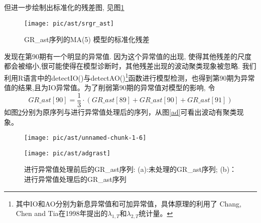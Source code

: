 \documentclass[10.5pt,onecolumn,a4paper]{article}%
\begin{document}
但进一步绘制出标准化的残差图, 见图\ref{fig:srgrast}
\begin{figure}
	\centering
	\texttt{[image: pic/ast/srgr\_ast]}
	\caption{GR\_ast序列的MA(5) 模型的标准化残差}
	\label{fig:srgrast}
\end{figure}
发现在第90期有一个明显的异常值. 因为这个异常值的出现, 使得其他残差的尺度都会被缩小,很可能使得在模型诊断时，其他残差出现的波动聚类现象被忽略. 我们利用R语言中的detectIO()与detectAO()\footnote{其中IO和AO分别为新息异常值和可加异常值，具体原理的利用了 Chang, Chen and Tia在1998年提出的$\lambda_{1,T}$和$\lambda_{2,T}$统计量。}函数进行模型检测，也得到第90期为异常值的结果,且为IO异常值。为了削弱第90期的异常值对模型的影响, 令
\begin{equation}
GR\_ast[90] = \frac{1}{3} \cdot (GR\_ast[89]+GR\_ast[90]+GR\_ast[91])
\end{equation}
如图\ref{ioad}分别为原序列与进行异常值处理后的序列，从图\ref{ad}可看出波动有聚类现象。
\begin{figure}[h!]
	\begin{minipage}[ht]{0.48\textwidth}
		\centering
		\texttt{[image: pic/ast/unnamed-chunk-1-6]}
		\subcaption{}\label{io}
	\end{minipage}%
	\hspace{0.04\textwidth}
	\begin{minipage}[ht]{0.48\textwidth}
		\centering
		\texttt{[image: pic/ast/adgrast]}
		\subcaption{}\label{ad}
	\end{minipage}
	\caption{进行异常值处理前后的GR\_ast序列: (a):未处理的GR\_ast序列; (b)：进行异常值处理后的GR\_ast序列}\label{ioad}
\end{figure}
\end{document}
